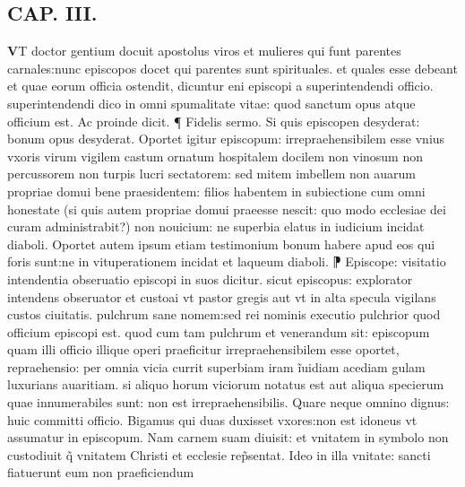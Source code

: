 \documentclass{article}
\begin{document}
\begin{pages}
\endnumbering\beginnumbering\section{CAP. III.}\pstart \huge\textbf{V}\normalsize T doctor gentium docuit apostolus viros et mulieres qui funt parentes carnales:nunc episcopos docet qui parentes sunt spirituales. et quales esse debeant et quae eorum officia ostendit, dicuntur eni episcopi a superintendendi officio. superintendendi dico in omni spumalitate vitae: quod sanctum opus atque  officium est. Ac proinde dicit. ¶ Fidelis sermo. Si quis episcopen desyderat: bonum opus desyderat. Oportet igitur episcopum: irrepraehensibilem esse  vnius vxoris virum  vigilem castum ornatum hospitalem docilem  non vinosum  non percussorem non turpis lucri sectatorem: sed mitem  imbellem  non auarum propriae domui bene praesidentem: filios habentem in subiectione cum   omni honestate (si quis autem propriae domui praeesse nescit: quo modo ecclesiae dei curam administrabit?) non nouicium: ne superbia elatus in iudicium incidat diaboli. Oportet autem ipsum etiam testimonium bonum habere apud eos qui foris sunt:ne in vituperationem incidat et laqueum diaboli. ⁋ Episcope: visitatio  intendentia  obseruatio episcopi in suos dicitur. sicut episcopus: explorator intendens obseruator et custoai vt pastor gregis aut vt in alta specula vigilans custos ciuitatis. pulchrum sane nomem:sed rei nominis executio pulchrior quod officium episcopi est. quod  cum tam pulchrum et venerandum sit: episcopum quam illi officio illique  operi praeficitur  irrepraehensibilem esse oportet, repraehensio: per omnia vicia currit superbiam iram  ĩuidiam  acediam  gulam luxurians auaritiam. si aliquo horum viciorum notatus est aut aliqua specierum quae innumerabiles sunt: non est irrepraehensibilis. Quare neque  omnino dignus: huic committi officio. Bigamus qui duas duxisset vxores:non est idoneus  vt assumatur in episcopum. Nam carnem suam diuisit: et vnitatem in symbolo non custodiuit  q̃ vnitatem Christi et ecclesie rep̃sentat. Ideo in illa vnitate: sancti fiatuerunt eum non praeficiendum  \pend
\endnumbering
\end{pages}
\end{document}
